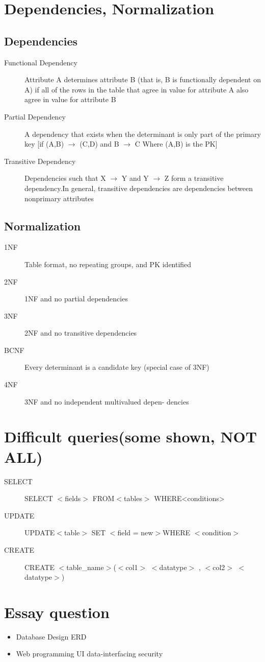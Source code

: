 \documentclass{article}
\begin{document}
\section{Dependencies, Normalization}
\subsection{Dependencies}
\begin{description}
	\item[Functional Dependency]  Attribute A determines attribute B (that is, B
is functionally dependent on A) if all of the rows
in the table that agree in value for attribute A
also agree in value for attribute B
	\item[Partial Dependency] A dependency that exists when the determinant is only part of the primary key [if (A,B) $\rightarrow$
(C,D) and B $\rightarrow$ C Where (A,B) is the PK]
	\item[Transitive Dependency] Dependencies such that X $\rightarrow$ Y and Y $\rightarrow$ Z
form a transitive dependency.In general, transitive dependencies are dependencies between nonprimary attributes
\end{description}


\subsection{Normalization}
\begin{description}
	\item[1NF]  Table format, no repeating groups, and PK
identified
	\item[2NF]  1NF and no partial dependencies
	\item[3NF]  2NF and no transitive dependencies
	\item[BCNF] Every determinant is a candidate key (special
case of 3NF)
	\item[4NF]3NF and no independent multivalued depen-
dencies 
\end{description}
\section{Difficult queries(some shown, NOT ALL)}
\begin{description}
	\item[SELECT]SELECT $<$fields$>$ FROM$<$tables$>$ WHERE<conditions> 
	\item[UPDATE] UPDATE$<$table$>$ SET $<$field = new$>$WHERE $<$condition$>$
	\item[CREATE] CREATE $<$table\_name$>$($<$col1$>$ $<$datatype$>$ , $<$col2$>$ $<$datatype$>$)

\end{description}
\section{Essay question}
\begin{itemize}
	\item Database Design
		\subitem ERD
	\item Web programming
		\subitem UI
		\subitem data-interfacing		
		\subitem security
\end{itemize}
\end{document}
